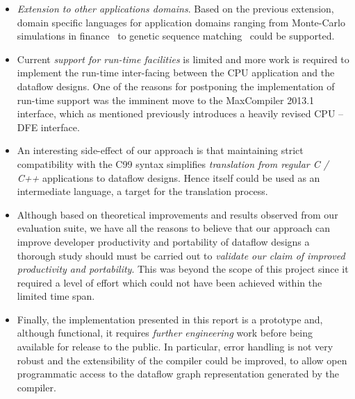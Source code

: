 \begin{itemize}
\item \emph{Extension to other applications domains}.  Based on the
  previous extension, domain specific languages for application
  domains ranging from Monte-Carlo simulations in
  finance~\cite{Jin:2012} to genetic sequence
  matching~\cite{Arram:2013} could be supported.

\item Current \emph{support for run-time facilities} is limited and more work
  is required to implement the run-time inter-facing between the CPU
  application and the dataflow designs. One of the reasons for
  postponing the implementation of run-time support was the imminent
  move to the MaxCompiler 2013.1 interface, which as mentioned
  previously introduces a heavily revised CPU -- DFE interface.

\item An interesting side-effect of our approach is that maintaining
  strict compatibility with the C99 syntax simplifies
  \emph{translation from regular C / C++} applications to \FAST{}
  dataflow designs. Hence \FAST{} itself could be used as an
  intermediate language, a target for the translation process.

\item Although based on theoretical improvements and results observed
  from our evaluation suite, we have all the reasons to believe that
  our approach can improve developer productivity and portability of
  dataflow designs a thorough study should must be carried out to
  \emph{validate our claim of improved productivity and
    portability}. This was beyond the scope of this project since it
  required a level of effort which could not have been achieved within the
  limited time span.

\item Finally, the implementation presented in this report is a
  prototype and, although functional, it requires \emph{further
    engineering} work before being available for release to the
  public. In particular, error handling is not very robust and the
  extensibility of the compiler could be improved, to allow open
  programmatic access to the dataflow graph representation generated
  by the \fastc{} compiler.

\end{itemize}

